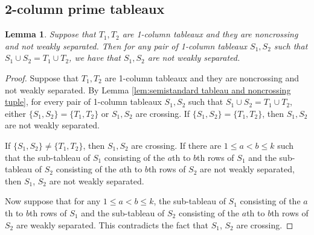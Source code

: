 \documentclass[12pt, reqno]{amsart}
\theoremstyle{plain}
\newtheorem{lemma}[theorem]{Lemma}
\theoremstyle{definition}
\numberwithin{equation}{section}
\begin{document}
\subsection{2-column prime tableaux} \label{subsec:2-column prime tableaux}

\begin{lemma} \label{lem:T1T2 non crossing and not weakly separated implies that if S1 S2 is T1 T2 then S1 S2 not weakly separated}
Suppose that $T_1, T_2$ are 1-column tableaux and they are noncrossing and not weakly separated. Then for any pair of 1-column tableaux $S_1, S_2$ such that $S_1 \cup S_2 = T_1 \cup T_2$, we have that $S_1, S_2$ are not weakly separated. 
\end{lemma}

\begin{proof}
Suppose that $T_1, T_2$ are 1-column tableaux and they are noncrossing and not weakly separated. By Lemma \ref{lem:semistandard tableau and noncrossing tuple}, for every pair of 1-column tableaux $S_1, S_2$ such that $S_1 \cup S_2 = T_1 \cup T_2$, either $\{S_1, S_2\} = \{T_1, T_2\}$ or $S_1, S_2$ are crossing. If $\{S_1, S_2\} = \{T_1, T_2\}$, then $S_1, S_2$ are not weakly separated. 

If $\{S_1, S_2\} \ne \{T_1, T_2\}$, then $S_1, S_2$ are crossing. If there are $1 \le a < b \le k$ such that the sub-tableau of $S_1$ consisting of the $a$th to $b$th rows of $S_1$ and the sub-tableau of $S_2$ consisting of the $a$th to $b$th rows of $S_2$ are not weakly separated, then $S_1$, $S_2$ are not weakly separated. 

Now suppose that for any $1 \le a < b \le k$, the sub-tableau of $S_1$ consisting of the $a$th to $b$th rows of $S_1$ and the sub-tableau of $S_2$ consisting of the $a$th to $b$th rows of $S_2$ are weakly separated. This contradicts the fact that $S_1$, $S_2$ are crossing.
\end{proof}
 
\end{document}
